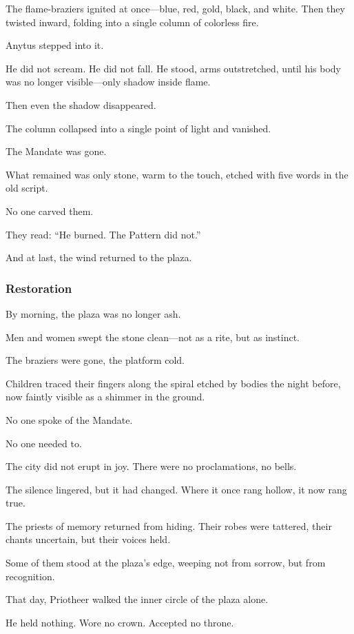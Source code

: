 \documentclass[12pt]{article}
\begin{document}
The flame-braziers ignited at once—blue, red, gold, black, and white. Then they twisted inward, folding into a single column of colorless fire.

Anytus stepped into it.

He did not scream. He did not fall. He stood, arms outstretched, until his body was no longer visible—only shadow inside flame.

Then even the shadow disappeared.

The column collapsed into a single point of light and vanished.

The Mandate was gone.

What remained was only stone, warm to the touch, etched with five words in the old script.

No one carved them.

They read: “He burned. The Pattern did not.”

And at last, the wind returned to the plaza.

\dotfill

\subsubsection*{Restoration}

By morning, the plaza was no longer ash.

Men and women swept the stone clean—not as a rite, but as instinct. 

The braziers were gone, the platform cold. 

Children traced their fingers along the spiral etched by bodies the night before, now faintly visible as a shimmer in the ground. 

No one spoke of the Mandate. 

No one needed to.

The city did not erupt in joy. There were no proclamations, no bells. 

The silence lingered, but it had changed. Where it once rang hollow, it now rang true.

The priests of memory returned from hiding. Their robes were tattered, their chants uncertain, but their voices held. 

Some of them stood at the plaza’s edge, weeping not from sorrow, but from recognition.

That day, Priotheer walked the inner circle of the plaza alone.

He held nothing. Wore no crown. Accepted no throne.
\end{document}
